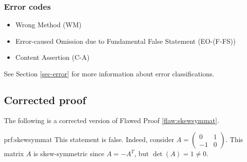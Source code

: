 \subsubsection{Error codes}
\begin{itemize}
\item Wrong Method (WM)	
\item Error-caused Omission due to Fundamental False Statement (EO-(F-FS))
	\item Content Assertion (C-A)
\end{itemize}
See Section \ref{sec-error} for more information about error classifications.

\clearpage
\subsection{Corrected proof}

The following is a corrected version of Flawed Proof \ref{flaw:skewsymmat}. %

\begin{prf}{prf:skewsymmat} %
This statement is false. Indeed, consider $A = \begin{pmatrix}0 & 1 \\ -1 & 0 \end{pmatrix}$. This matrix $A$ is skew-symmetric since $A = -A^T$, but $\det(A) = 1 \neq 0$.
\end{prf} 